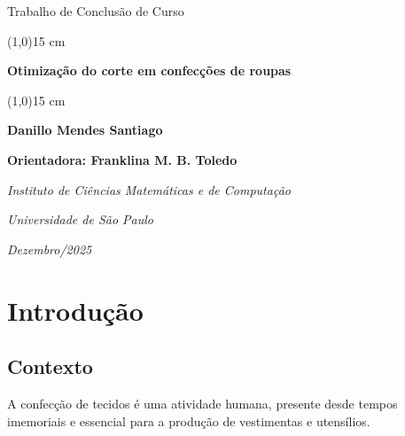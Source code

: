 \documentclass[a4paper, 12pt]{article}
\begin{document}
\onehalfspacing

\thispagestyle{empty}

\begin{center}
{\Huge Trabalho de Conclusão de Curso}
\end{center}

\vspace{3.5cm}

\begin{center}
    \line(1,0){15 cm}
    
    \vspace{1cm}
    
    {\large {\bf Otimização do corte em confecções de roupas}}
    
    \vspace{0.8cm}
    
    \line(1,0){15 cm}

\vspace{3cm}

{\large \textbf{Danillo Mendes Santiago}}

\vspace{3cm}

\noindent
\textbf{Orientadora: Franklina M. B. Toledo}
\end{center}

\vspace{1cm}

\begin{center}   
    \noindent
    \textit{Instituto de Ciências Matemáticas e de Computação}
    
    \noindent
    \textit{Universidade de São Paulo}
    
    \vspace{0.5cm}
    
    \textit{Dezembro/2025}
\end{center}

\newpage
\tableofcontents
\newpage

\section{Introdução}
\label{sec:introducao}

\subsection{Contexto}
\label{sub:contexto}
A confecção de tecidos é uma atividade humana, presente desde tempos imemoriais e essencial para a produção de vestimentas e utensílios.
\end{document}
